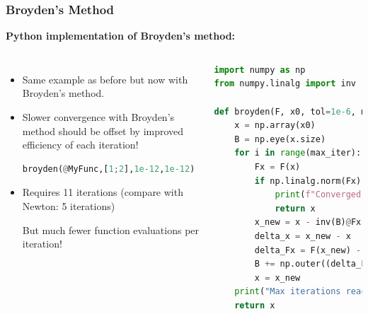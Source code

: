   \begin{frame}[fragile]
    \frametitle{Broyden's Method}
    \textbf{Python implementation of Broyden's method:}
    \begin{columns}
    \begin{itemize}
      \item Same example as before but now with Broyden's method.
      \item Slower convergence with Broyden's method should be offset by improved efficiency of each iteration!
      \begin{lstlisting}[language=Python]
broyden(@MyFunc,[1;2],1e-12,1e-12)
      \end{lstlisting}
      \item Requires 11 iterations (compare with Newton: 5 iterations)
      
      But much fewer function evaluations per iteration!
    \end{itemize}
  
    \begin{lstlisting}[language=Python]
import numpy as np
from numpy.linalg import inv

def broyden(F, x0, tol=1e-6, max_iter=100):
    x = np.array(x0)
    B = np.eye(x.size)
    for i in range(max_iter):
        Fx = F(x)
        if np.linalg.norm(Fx) < tol:
            print(f"Converged after {i} iterations.")
            return x
        x_new = x - inv(B)@Fx
        delta_x = x_new - x
        delta_Fx = F(x_new) - Fx
        B += np.outer((delta_Fx - B@delta_x)/(delta_x@delta_x), delta_x)
        x = x_new
    print("Max iterations reached.")
    return x
    \end{lstlisting}
  \end{columns}
  \end{frame}

